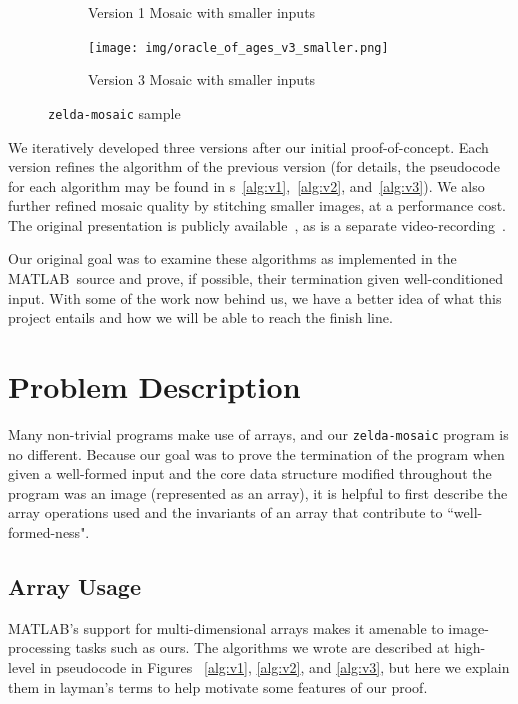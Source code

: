 \documentclass[11pt,conference]{IEEEtran}
\newcommand{\matlab}{MATLAB}
\theoremstyle{plain} %
\theoremstyle{definition}
\theoremstyle{remark}
\begin{document}
\begin{figure}[pht]
\begin{subfigure}{0.35\textwidth}
        \caption{Version 1 Mosaic with smaller inputs}
    \end{subfigure}
    \begin{subfigure}{0.35\textwidth}
        \texttt{[image: img/oracle\_of\_ages\_v3\_smaller.png]}
        \caption{Version 3 Mosaic with smaller inputs}
    \end{subfigure}
    \caption{\texttt{zelda-mosaic} sample}\label{F:zelda-mosaic-sample}
\end{figure}

We iteratively developed three versions after our initial proof-of-concept. Each
version refines the algorithm of the previous version (for details, the
pseudocode for each algorithm may be found in
\figurename{s}~\ref{alg:v1},~\ref{alg:v2}, and~\ref{alg:v3}). We also further
refined mosaic quality by stitching smaller images, at a performance cost. The
original presentation is publicly available~\cite{zelda_mosaic_pres}, as is a
separate video-recording~\cite{zelda_mosaic_vid}.

Our original goal was to examine these algorithms as implemented in the \matlab\
source and prove, if possible, their termination given well-conditioned input.
With some of the work now behind us, we have a better idea of what this project
entails and how we will be able to reach the finish line.

\section{Problem Description}
Many non-trivial programs make use of arrays, and our \texttt{zelda-mosaic} program is no different. Because our goal was to prove the termination of the program when given a well-formed input and the core data structure modified throughout the program was an image (represented as an array), it is helpful to first describe the array operations used and the invariants of an array that contribute to ``well-formed-ness".

\subsection{Array Usage}
\matlab's support for multi-dimensional arrays makes it amenable to image-processing tasks such as ours. The algorithms we wrote are described at high-level in pseudocode in Figures \figurename~\ref{alg:v1}, \ref{alg:v2}, and \ref{alg:v3}, but here we explain them in layman's terms to help motivate some features of our proof.\\
\end{document}
